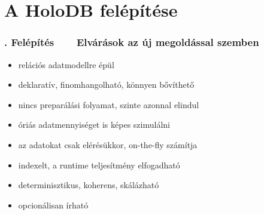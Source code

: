 \documentclass[
    aspectratio=169,
]{beamer}
\newcommand{\slidetitle}[2]{\frametitle{{\small #1 ~ \ding{226} ~ } \normalsize \textbf{#2} }}
\begin{document}
\section{A HoloDB felépítése}
\def\sectionshorttitle{. Felépítés}

\begin{frame}
    \slidetitle{\sectionshorttitle}{Elvárások az új megoldással szemben}
    
    \begin{itemize}
        \setlength\itemsep{0.5em}
        \item {\color{red}relációs adatmodell}re épül
        \item {\color{red}deklaratív}, finomhangolható, könnyen bővíthető
        \item {\color{red}nincs preparálás}i folyamat, szinte azonnal elindul
        \item óriás adatmennyiséget is képes szimulálni
        \item az adatokat csak elérésükkor, {\color{red}on-the-fly} számítja
        \item indexelt, a runtime teljesítmény elfogadható
        \item determinisztikus, {\color{red}koherens}, skálázható
        \item opcionálisan írható
    \end{itemize}
\end{frame}
\end{document}
